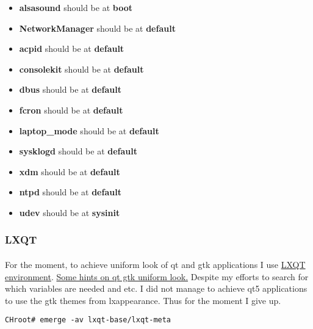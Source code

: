 \documentclass[11pt,a4paper]{article}
\begin{document}
                    \begin{itemize}
                        \item \textbf{alsasound} should be at \textbf{boot}
                        \item \textbf{NetworkManager} should be at \textbf{default}
                        \item \textbf{acpid} should be at \textbf{default}
                        \item \textbf{consolekit} should be at \textbf{default}
                        \item \textbf{dbus} should be at \textbf{default}
                        \item \textbf{fcron} should be at \textbf{default}
                        \item \textbf{laptop\_mode} should be at \textbf{default}
                        \item \textbf{sysklogd} should be at \textbf{default}
                        \item \textbf{xdm} should be at \textbf{default}
                        \item \textbf{ntpd} should be at \textbf{default}
                        \item \textbf{udev} should be at \textbf{sysinit}
                    \end{itemize}
                
                \newpage
                \subsubsection{LXQT}
                
                    \paragraph{} For the moment, to achieve uniform look of qt and gtk applications I use \href{https://wiki.gentoo.org/wiki/LXQt}{LXQT environment}. \href{https://wiki.archlinux.org/index.php/GTK\%2B#GTK.2B_and_Qt}{Some hints on qt gtk uniform look.} Despite my efforts to search for which variables are needed and etc. I did not manage to achieve qt5 applications to use the gtk themes from lxappearance. Thus for the moment I give up.
                    
                    \begin{lstlisting}[style=BashInputCHRoot]
 CHroot# emerge -av lxqt-base/lxqt-meta
                    \end{lstlisting}
                    
\end{document}
